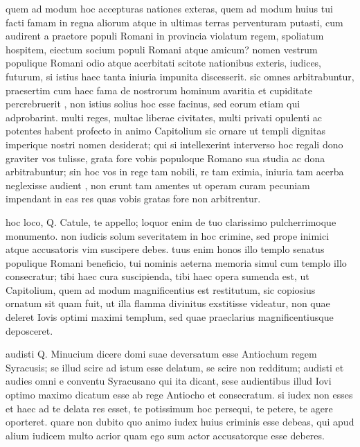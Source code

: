  quem ad modum hoc accepturas nationes exteras, quem ad modum huius tui facti famam in regna aliorum atque in ultimas terras perventuram putasti, cum audirent a praetore populi Romani in provincia violatum regem, spoliatum hospitem, eiectum socium populi Romani atque amicum? nomen vestrum populique Romani odio atque acerbitati scitote nationibus exteris, iudices, futurum, si istius haec tanta iniuria impunita discesserit. sic omnes arbitrabuntur, praesertim cum haec fama de nostrorum hominum avaritia et cupiditate percrebruerit , non istius solius hoc esse facinus, sed eorum etiam qui adprobarint. multi reges, multae liberae civitates, multi privati opulenti ac potentes habent profecto in animo Capitolium sic ornare ut templi dignitas imperique nostri nomen desiderat; qui si intellexerint interverso hoc regali dono graviter vos tulisse, grata fore vobis populoque Romano sua studia ac dona arbitrabuntur; sin hoc vos in rege tam nobili, re tam eximia, iniuria tam acerba neglexisse audient , non erunt tam amentes ut operam curam pecuniam impendant in eas res quas vobis gratas fore non arbitrentur.

 hoc loco, Q. Catule, te appello; loquor enim de tuo clarissimo pulcherrimoque monumento. non iudicis solum severitatem in hoc crimine, sed prope inimici atque accusatoris vim suscipere debes. tuus enim honos illo templo senatus populique Romani beneficio, tui nominis aeterna memoria simul cum templo illo consecratur; tibi haec cura suscipienda, tibi haec opera sumenda est, ut Capitolium, quem ad modum magnificentius est restitutum, sic copiosius ornatum sit quam fuit, ut illa flamma divinitus exstitisse videatur, non quae deleret Iovis optimi maximi templum, sed quae praeclarius magnificentiusque deposceret.

 audisti Q. Minucium dicere domi suae deversatum esse Antiochum regem Syracusis; se illud scire ad istum esse delatum, se scire non redditum; audisti et audies omni e conventu Syracusano qui ita dicant, sese audientibus illud Iovi optimo maximo dicatum esse ab rege Antiocho et consecratum. si iudex non esses et haec ad te delata res esset, te potissimum hoc persequi, te petere, te agere oporteret. quare non dubito quo animo iudex huius criminis esse debeas, qui apud alium iudicem multo acrior quam ego sum actor accusatorque esse deberes.

